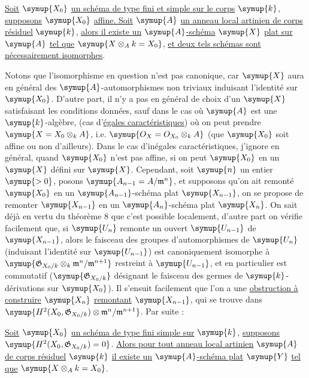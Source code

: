  \uline{Soit} $\symup{X_0}$ \uline{un schéma de type fini et simple sur le corps}
$\symup{k}$, \uline{supposons} $\symup{X_0}$ \uline{affine. Soit} $\symup{A}$ \uline{un anneau local artinien de corps
résiduel} $\symup{k}$, \uline{alors il existe un} $\symup{A}$\uline{-schéma} $\symup{X}$ \uline{plat sur} $\symup{A}$ \uline{tel que}
$\symup{X\otimes_A k=X_0}$, \uline{et deux tels schémas sont nécessairement isomorphes}.

Notons que l'isomorphisme en question n'est pas canonique, car $\symup{X}$ aura en
général des $\symup{A}$-automorphismes non triviaux induisant l'identité sur $\symup{X_0}$.
D'autre part, il n'y a pas en général de choix  d'un $\symup{X}$
satisfaisant les conditions données, sauf dans le cas où $\symup{A}$ est une
$\symup{k}$-algèbre, (cas d'\uline{égales caractéristiques}) où on peut prendre
$\symup{X=X_0\otimes_k A}$, i.e. $\symup{O_X=O_{X_0}\otimes_k A}$ (que $\symup{X_0}$ soit affine
ou non d'ailleurs). Dans le cas d'inégales caractéristiques, j'ignore en
général, quand $\symup{X_0}$ n'est pas affine, si on peut  $\symup{X_0}$ en un $\symup{X}$
défini sur $\symup{X}$. Cependant, soit $\symup{n}$ un entier $\symup{>0}$, posons
$\symup{A_{n-1}=A/\mathfrak m^n}$, et supposons qu'on ait remonté $\symup{X_0}$ en un
$\symup{A_{n-1}}$-schéma plat $\symup{X_{n-1}}$, on se propose de remonter $\symup{X_{n-1}}$ en un
$\symup{A_n}$-schéma plat $\symup{X_n}$. On sait déjà en vertu du théorème 8 que c'est possible
localement, d'autre part on vérifie facilement que, si $\symup{U_n}$ remonte un ouvert
$\symup{U_{n-1}}$ de $\symup{X_{n-1}}$, alors le faisceau des groupes d'automorphismes de $\symup{U_n}$
(induisant l'identité sur $\symup{U_{n-1}}$) est canoniquement isomorphe à
$\symup{\mathfrak G_{X_0/k}\otimes_k\mathfrak m^n/\mathfrak m^{n+1}}$
restreint à $\symup{U_{n-1}}$, et en particulier est commutatif
($\symup{\mathfrak G_{X_0/k}}$ désignant le faisceau des germes de $\symup{k}$-dérivations sur
$\symup{X_0}$). Il s'ensuit facilement que l'on a une \uline{obstruction à construire} $\symup{X_n}$
\uline{remontant} $\symup{X_{n-1}}$, qui se trouve dans
$\symup{H^2(X_0,\mathfrak G_{X_0/k})\otimes \mathfrak m^n/\mathfrak m^{n+1}}$.
Par suite :

 \uline{Soit} $\symup{X_0}$ \uline{un schéma de type fini simple sur} $\symup{k}$,
\uline{supposons}
$\symup{H^2(X_0,\mathfrak G_{X_0/k})=0}$. \uline{Alors pour tout anneau local artinien}
$\symup{A}$ \uline{de corps résiduel} $\symup{k}$ \uline{il existe un} $\symup{A}$\uline{-schéma plat} $\symup{Y}$ \uline{tel que}
$\symup{X\otimes_A k=X_0}$.

